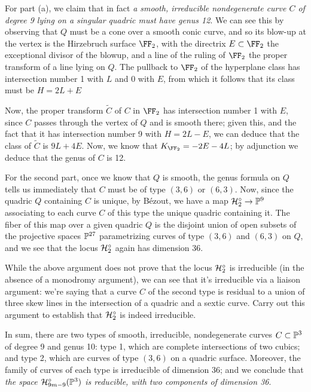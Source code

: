 For part (a), we claim that in fact \emph{a smooth, irreducible nondegenerate curve $C$ of degree 9 lying on a singular quadric must have genus 12}. We can see this by observing that $Q$ must be a cone over a smooth conic curve, and so its blow-up at the vertex is the Hirzebruch surface $\FF_2$, with the directrix $E \subset \FF_2$ the exceptional divisor of the blowup, and a line of the ruling of $\FF_2$ the proper transform of a line lying on $Q$. The pullback to $\FF_2$ of the hyperplane class has intersection number 1 with $L$ and 0 with $E$, from which it follows that its class must  be $H = 2L + E$

Now, the proper transform $\tilde C$ of $C$ in $\FF_2$ has intersection number 1 with $E$, since $C$ passes through the vertex of $Q$ and is smooth there; given this, and the fact that it has intersection number 9 with $H = 2L-E$, we can deduce that the class of $\tilde C$ is $9L + 4E$. Now, we know that $K_{\FF_2} = -2E - 4L$; by adjunction we deduce that  the genus of $C$ is 12.

For the second part, once we know that $Q$ is smooth, the genus formula on $Q$ tells us immediately that $C$ must be of type $(3,6)$ or $(6,3)$. Now, since the quadric $Q$ containing $C$ is unique, by B\'ezout, we have a map $\cH^\circ_2 \to \PP^9$ associating to each curve $C$ of this type the unique quadric containing it. The fiber of this map over a given quadric $Q$ is the disjoint union of open subsets of the projective spaces $\PP^{27}$ parametrizing curves of type $(3,6)$ and $(6,3)$ on $Q$, and we see that the locus $\cH^\circ_2$ again has dimension 36.

\begin{exercise}
While the above argument does not prove that the locus $\cH^\circ_2$ is irreducible (in the absence of a monodromy argument), we can see that it's irreducible via a liaison argument: we're saying that a curve $C$ of the second type is residual to a union of three skew lines in the intersection of a quadric and a sextic curve. Carry out this argument to establish that $\cH^\circ_2$ is indeed irreducible.
\end{exercise}


In sum, there are two types of smooth, irreducible, nondegenerate curves $C \subset \PP^3$ of degree 9 and genus 10: type 1, which are complete intersections of two cubics; and type 2, which are curves of type $(3,6)$ on a quadric surface. Moreover, the family of curves of each type is irreducible of dimension 36; and we conclude that \emph{the space $\cH^\circ_{9m-9}(\PP^3)$ is reducible, with two components of dimension 36}.


